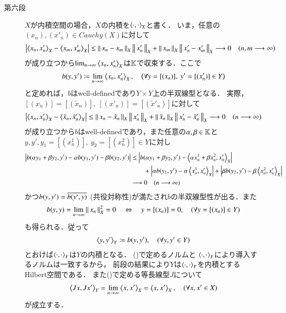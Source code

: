 \begin{prf}
\begin{description}
			\item[第六段]
				$X$が内積空間の場合，$X$の内積を$\inprod<\cdot,\cdot>_X$と書く．
				いま，任意の$(x_n),(x'_n) \in Cauchy(X)$に対して
				\begin{align}
					\left| \inprod<x_n,x'_n>_X - \inprod<x_m,x'_m>_X \right|
					\leq \Norm{x_n - x_m}{X}\Norm{x'_n}{X} + \Norm{x_m}{X}\Norm{x'_n - x'_m}{X} 
					\longrightarrow 0
					\quad (n,m \longrightarrow \infty)
				\end{align}
				が成り立つから$\lim_{n \to \infty} \inprod<x_n,x'_n>_X$は$\mathbb{K}$で収束する．ここで
				\begin{align}
					b(y,y') \coloneqq \lim_{n \to \infty} \inprod<x_n, x'_n>_X,
					\quad \left( \forall y = [(x_n)],\ y' = [(x'_n)] \in Y \right)
				\end{align}
				と定めれば，$b$はwell-definedであり$Y \times Y$上の半双線型となる．
				実際，$[(x_n)] = [(\tilde{x}_n)],\ [(x'_n)] = [(\tilde{x}'_n)]$に対して
				\begin{align}
					\left| \inprod<x_n,x'_n>_X - \inprod<\tilde{x}_n,\tilde{x}'_n>_X \right|
					\leq \Norm{x_n - \tilde{x}_n}{X}\Norm{x'_n}{X} 
						+ \Norm{\tilde{x}_n}{X}\Norm{x'_n - \tilde{x}'_n}{X} 
					\longrightarrow 0
					\quad (n \longrightarrow \infty)
				\end{align}
				が成り立つから$b$はwell-definedであり，また任意の$\alpha,\beta \in \mathbb{K}$と
				$y,y',y_1 = [(x^1_n)],\ y_2 = [(x^2_n)] \in Y$に対し
				\begin{align}
					\left| b(\alpha y_1 + \beta y_2,y') - \alpha b(y_1,y') - \beta b(y_2,y') \right|
					&\leq \left| b(\alpha y_1 + \beta y_2,y') - \inprod<\alpha x^1_n + \beta x^2_n,x'_n>_X \right| \\
					&\qquad+ \left| \alpha b(y_1,y') - \alpha \inprod<x^1_n,x'_n>_X \right|
					+ \left| \beta b(y_2,y') - \beta \inprod<x^2_n,x'_n>_X \right| \\
					&\longrightarrow 0 \quad (n \longrightarrow \infty)
				\end{align}
				かつ$b(y,y') = \overline{b(y',y)}$ (共役対称性)が満たされ$b$の半双線型性が出る．また
				\begin{align}
					b(y,y) = \lim_{n \to \infty} \left\|\, x_n\, \right\|_{X}^2 = 0
					\quad \Leftrightarrow \quad y = [(x_n)] = 0,
					\quad (\forall y = [(x_n)] \in Y)
				\end{align}
				も得られる．従って
				\begin{align}
					\inprod<y,y'>_Y \coloneqq b(y,y'),
					\quad (\forall y,y' \in Y)
				\end{align}
				とおけば$\inprod<\cdot,\cdot>_Y$は$Y$の内積となる．
				()で定めるノルムと
				$\inprod<\cdot,\cdot>_Y$により導入するノルムは一致するから，
				前段の結果により$Y$は$\inprod<\cdot,\cdot>_Y$を内積とするHilbert空間である．
				また()で定める等長線型$J$について
				\begin{align}
					\inprod<Jx,Jx'>_Y = \lim_{n \to \infty} \inprod<x,x'>_X 
					= \inprod<x,x'>_X,
					\quad (\forall x,x' \in X)
				\end{align}
				が成立する．
				\QED
		\end{description}
	\end{prf}